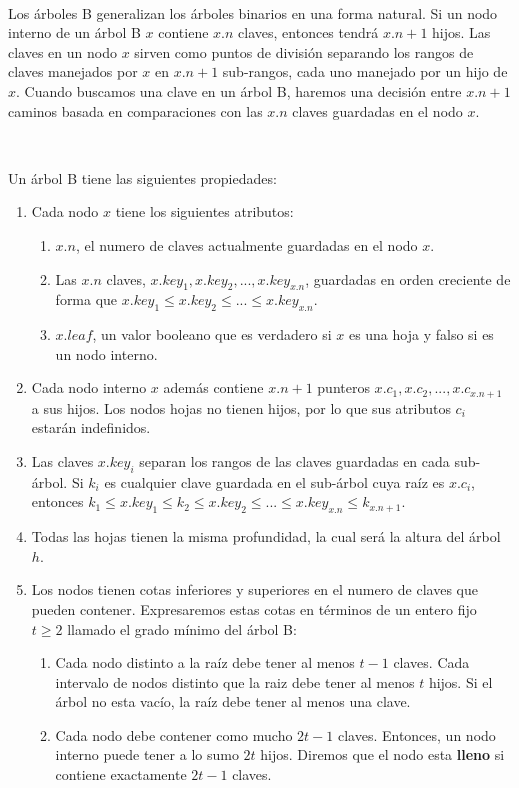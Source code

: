 ~

Los \'arboles B generalizan los \'arboles binarios en una forma natural. Si un nodo interno de un \'arbol B $x$ contiene $x.n$ claves, entonces tendr\'a $x.n+1$  hijos. Las claves en un nodo $x$ sirven como puntos de divisi\'on separando los rangos de claves manejados por $x$ en $x.n+1$ sub-rangos, cada uno manejado por un hijo de $x$. Cuando buscamos una clave en un \'arbol B, haremos una decisi\'on entre $x.n+1$ caminos basada en comparaciones con las $x.n$ claves guardadas en el nodo $x$.

~

Un \'arbol B tiene las siguientes propiedades:

\begin{enumerate}
 \item Cada nodo $x$ tiene los siguientes atributos:
 \begin{enumerate}
  \item $x.n$, el numero de claves actualmente guardadas en el nodo $x$.
  \item Las $x.n$ claves, $x.key_1, x.key_2, ..., x.key_{x.n}$, guardadas en orden creciente de forma que $x.key_1\leq x.key_2\leq ...\leq x.key_{x.n}$.
  \item $x.leaf$, un valor booleano que es verdadero si $x$ es una hoja y falso si es un nodo interno.
 \end{enumerate}
 \item Cada nodo interno $x$ adem\'as contiene $x.n+1$ punteros $x.c_1,x.c_2,...,x.c_{x.n+1}$ a sus hijos. Los nodos hojas no tienen hijos, por lo que sus atributos $c_i$ estar\'an indefinidos.
 \item Las claves $x.key_i$ separan los rangos de las claves guardadas en cada sub-\'arbol. Si $k_i$ es cualquier clave guardada en el sub-\'arbol cuya ra\'iz es $x.c_i$, entonces $k_1 \leq x.key_1 \leq k_2 \leq x.key_2 \leq ... \leq x.key_{x.n} \leq k_{x.n+1}$.
 \item Todas las hojas tienen la misma profundidad, la cual ser\'a la altura del \'arbol $h$.
 \item Los nodos tienen cotas inferiores y superiores en el numero de claves que pueden contener. Expresaremos estas cotas en t\'erminos de un entero fijo $t \geq 2$ llamado el grado m\'inimo del \'arbol B:
 \begin{enumerate}
  \item Cada nodo distinto a la ra\'iz debe tener al menos $t-1$ claves. Cada intervalo de nodos distinto que la raiz debe tener al menos $t$ hijos. Si el \'arbol no esta vac\'io, la ra\'iz debe tener al menos una clave.
  \item Cada nodo debe contener como mucho $2t-1$ claves. Entonces, un nodo interno puede tener a lo sumo $2t$ hijos. Diremos que el nodo esta \textbf{lleno} si contiene exactamente $2t - 1$ claves.
 \end{enumerate}
\end{enumerate}

